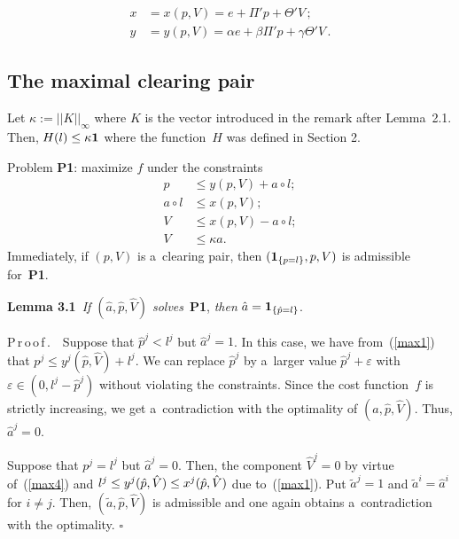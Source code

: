 \begin{multicols}{2}
\vspace*{-4pt}

\noindent
\begin{align*}
x &= x(p, V) = e + \Pi' p + \Theta' V\,; \\
 y &= y(p, V) = \alpha e + \beta \Pi' p + \gamma \Theta' V\,.
\end{align*}

\vspace*{-6pt}

\subsection{The maximal clearing pair}

\noindent
Let $\kappa:=||K||_\infty$ where $K$ is the vector introduced in the remark after Lemma~2.1. 
 Then, $H(l) \leq \kappa {\bf 1} $ where the function~$H$ was defined in Section 2. 

Problem {\bf P1}: maximize $f$ under the constraints 
\begin{align}
 \label{max1}
 p &\le y(p,V) + a \circ l; \\
 \label{max2}
 a \circ l &\le x(p,V); \\
\label{max3}
 V &\le x(p,V) - a \circ  l; \\
\label{max4}
 V &\leq \kappa a.
\end{align}
Immediately, if $(p, V)$ is a~clearing pair, then $({\bf 1}_{\{p = l\}}, p, V)$ is admissible for~{\bf P1}.

\smallskip

\noindent
\textbf{Lemma 3.1}\
\textit{If $(\hat a, \hat p, \hat V)$ solves}~\textbf{P1}, \textit{then} $\hat a = {\bf 1}_{\{\hat p = l\}}$.


\smallskip
\noindent
P\,r\,o\,o\,f\,.\ \  Suppose that 
 $\hat p^j < l^j$ but $\hat a^j=1$. In this case, we have from~(\ref{max1}) 
 that   $p^j\le y^j(\hat p,\hat V) + l^j $. We can replace  
 $\hat p^j$ by a~larger value $\hat p^j+\varepsilon$ with $\varepsilon\in (0,l^j-\hat p^j)$ 
 without violating the constraints.  Since the cost function~$f$ is strictly increasing, we get a~contradiction with
 the optimality of  $(\hat a, \hat p, \hat V)$. Thus,  $\hat a^j = 0$. 

Suppose that  $p^j = l^j$ but $\hat a^j = 0$. Then, the component $\hat V^j = 0$ by virtue of~(\ref{max4})
 and  $l^j \leq y^j (\hat p,\hat V)\linebreak \leq x^j(\hat p, \hat V)$ due to~(\ref{max1}). 
 Put $\tilde a^j = 1$ and $\tilde a^i = \hat a^i$ for $i \neq j$.
  Then,  $(\tilde a, \hat p, \hat V)$ is admissible and one again obtains a~contradiction with the optimality. \hfill$\square$


\end{multicols}

